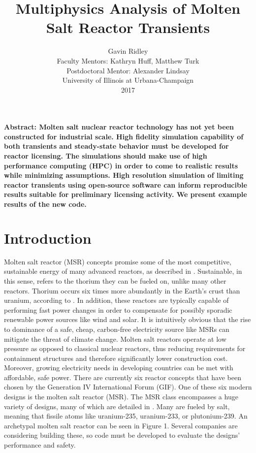 \documentclass[12pt]{article}
\title{Multiphysics Analysis of Molten Salt Reactor Transients}
\author{Gavin Ridley\\
        Faculty Mentors: Kathryn Huff, Matthew Turk \\
        Postdoctoral Mentor: Alexander Lindsay \\
        University of Illinois at Urbana-Champaign \\
        2017 \\}
\begin{document}
\maketitle

\textbf{Abstract: Molten salt nuclear reactor technology has not yet been constructed for industrial scale.
 High fidelity simulation capability of both transients and steady-state behavior must be developed
for reactor licensing. The simulations should make use of high performance computing (HPC) in order
to come to realistic results while minimizing assumptions. High resolution simulation of limiting reactor transients using
open-source software can inform reproducible results suitable for preliminary licensing activity. We present example results of the new code.}

\newpage

\section{Introduction}

Molten salt reactor (MSR) concepts promise some of the most competitive, sustainable energy of many advanced reactors, as described in \cite{siemer_why_2015}. Sustainable, in this sense, refers to the thorium they can be fueled on, unlike many other reactors. Thorium occurs six times more abundantly in the Earth’s crust than uranium, according to \cite{usgs}. 
In addition, these reactors are typically capable of performing fast power changes in order to compensate for possibly sporadic renewable power sources like wind and solar. It is intuitively obvious that the rise to dominance of a safe, cheap, carbon-free electricity source like MSRs can mitigate the threat of climate change. Molten salt reactors operate at low pressure as opposed to classical nuclear reactors, thus reducing requirements for containment structures and therefore significantly lower construction cost. Moreover, growing electricity needs in developing countries can be met with affordable, safe power. There are currently six reactor concepts that have been chosen by the Generation IV International Forum (GIF). One of these six modern designs is the molten salt reactor (MSR). The MSR class encompasses a huge variety of designs, many of which are detailed in \cite{dolan}. Many are fueled by salt, meaning that fissile atoms like uranium-235, uranium-233, or plutonium-239. An archetypal molten salt reactor can be seen in Figure 1. Several companies \cite{6comp_2015} are considering building these, so code must be developed to evaluate the designs’ performance and safety.
\end{document}
